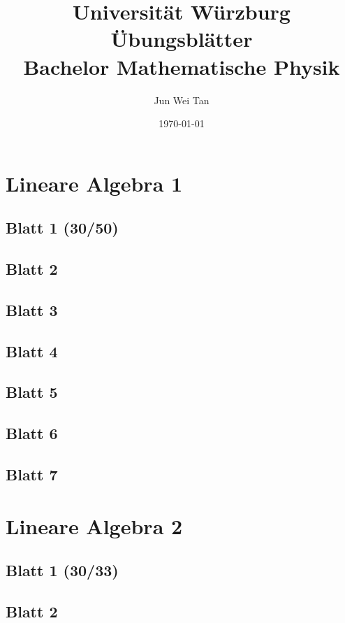 \documentclass{tuftebook}
\numberwithin{Theorem}{chapter}
\theoremstyle{definition}
\theoremstyle{definition}
\begin{document}
	\title{Universit\"{a}t W\"{u}rzburg \"{U}bungsbl\"{a}tter\\Bachelor Mathematische Physik}
	\author{Jun Wei Tan}
	\date{\today}
	\maketitle
	\tableofcontents

\chapter{Lineare Algebra 1}
\section{Blatt 1 (30/50)}

\section{Blatt 2}

\section{Blatt 3}

\section{Blatt 4}

\section{Blatt 5}

\section{Blatt 6}

\section{Blatt 7}


\chapter{Lineare Algebra 2}
\section{Blatt 1 (30/33)}

\section{Blatt 2}

\end{document}

